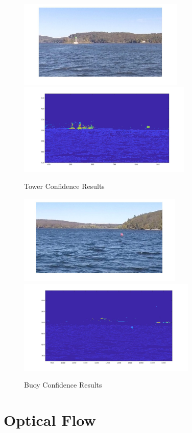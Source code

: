 \documentclass{article}
\begin{document}
\begin{figure}[H]
\label{fig:towerconf}
\includegraphics[width=7.9cm]{hsv_kmeans2_tower}
\includegraphics[width=8.3cm]{hsv_kmeans2_tower_result}
\centering
\caption{Tower Confidence Results}
\end{figure}

\begin{figure}[H]
\label{fig:buoyconf}
\includegraphics[width=7.8cm]{hsv_kmeans2_buoy}
\includegraphics[width=8.5cm]{hsv_kmeans2_buoy_result}
\centering
\caption{Buoy Confidence Results}
\end{figure}

\section{Optical Flow}
\end{document}
